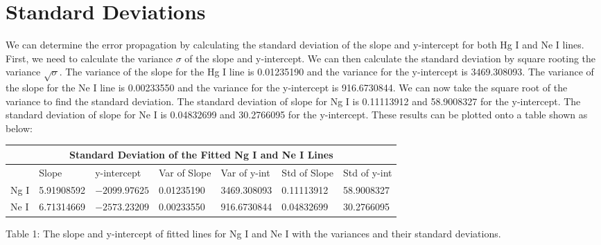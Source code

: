 \documentclass[onecolumn, 12pt, a4paper]{article}
\begin{document}
\section{Standard Deviations} \label{Std}
We can determine the error propagation by calculating the standard deviation of the slope and y-intercept for both Hg I and Ne I lines. First, we need to calculate the variance $\sigma$ of the slope and y-intercept. We can then calculate the standard deviation by square rooting the variance $\sqrt{\sigma}$. The variance of the slope for the Hg I line is 0.01235190 and the variance for the y-intercept is 3469.308093. The variance of the slope for the Ne I line is 0.00233550 and the variance for the y-intercept is 916.6730844. We can now take the square root of the variance to find the standard deviation. The standard deviation of slope for Ng I is 0.11113912 and 58.9008327 for the y-intercept. The standard deviation of slope for Ne I is 0.04832699 and 30.2766095 for the y-intercept. These results can be plotted onto a table shown as below:
\newline

\hspace*{-1cm}\begin{tabular}{ |p{1cm}||p{2cm}|p{2.3cm}|p{2.3cm}|p{2.3cm}|p{2cm}|p{2cm}| }
 \hline
 \multicolumn{7}{|c|}{Standard Deviation of the Fitted Ng I and Ne I Lines} \\
 \hline
 & Slope& y-intercept & Var of Slope & Var of y-int & Std of Slope & Std of y-int\\
 \hline
 Ng I & 5.91908592  & $-2099.97625$ & 0.01235190 & 3469.308093 & 0.11113912 & 58.9008327\\
 \hline
 Ne I & 6.71314669  & $-2573.23209$  & 0.00233550 & 916.6730844 & 0.04832699 & 30.2766095\\
 
 \hline
\end{tabular}
\newline
\begin{flushleft}
Table 1: The slope and y-intercept of fitted lines for Ng I and Ne I with the variances and their standard deviations.
\end{flushleft}
\end{document}
